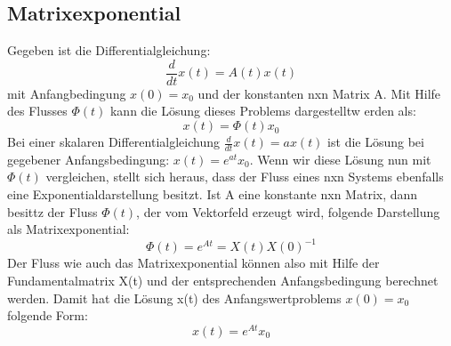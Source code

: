 
\subsection{Matrixexponential}
Gegeben ist die Differentialgleichung:
\begin{equation*}
\frac{d}{dt}x(t) = A(t)x(t)
\end{equation*}
mit Anfangbedingung $x(0) = x_0$ und der konstanten nxn Matrix A. Mit Hilfe des Flusses $\Phi(t)$ kann die Lösung dieses Problems dargestelltw erden als: 
\begin{equation*}
x(t) = \Phi(t)x_0
\end{equation*}
Bei einer skalaren Differentialgleichung $\frac{d}{dt}x(t) = ax(t)$ ist die Lösung bei gegebener Anfangsbedingung: $x(t) = e^{at}x_0$. Wenn wir diese Lösung nun mit $\Phi(t)$ vergleichen, stellt sich heraus, dass der Fluss eines nxn Systems ebenfalls eine Exponentialdarstellung besitzt. 
Ist A eine konstante nxn Matrix, dann besittz der Fluss $\Phi(t)$, der vom Vektorfeld erzeugt wird, folgende Darstellung als Matrixexponential: 
\begin{equation*}
\Phi(t) = e^{At} = X(t)X(0)^{-1}
\end{equation*}
Der Fluss wie auch das Matrixexponential können also mit Hilfe der Fundamentalmatrix X(t) und der entsprechenden Anfangsbedingung berechnet werden.
Damit hat die Lösung x(t) des Anfangswertproblems $x(0) = x_0$ folgende Form: 
\begin{equation*}
x(t) = e^{At}x_0
\end{equation*}


